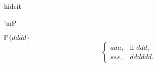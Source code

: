hideit

'mP

$\mathbb{P}\{dddd\}$
\[
    \begin{cases}
        aaa, & \text{if } ddd, \\
        sss, & dddddd .
    \end{cases}
\] 

